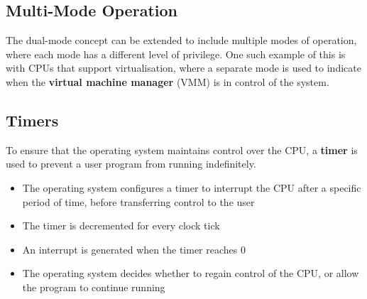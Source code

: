 \documentclass{article}
\begin{document}
\subsection{Multi-Mode Operation}
The dual-mode concept can be extended to include multiple modes of
operation, where each mode has a different level of privilege. One such
example of this is with CPUs that support virtualisation, where a
separate mode is used to indicate when the \textbf{virtual machine
manager} (VMM) is in control of the system.
\subsection{Timers}
To ensure that the operating system maintains control over the CPU, a
\textbf{timer} is used to prevent a user program from running
indefinitely.
\begin{itemize}
    \item The operating system configures a timer to interrupt the CPU
          after a specific period of time, before transferring control
          to the user
    \item The timer is decremented for every clock tick
    \item An interrupt is generated when the timer reaches 0
    \item The operating system decides whether to regain control of the
          CPU, or allow the program to continue running
\end{itemize}
\end{document}
